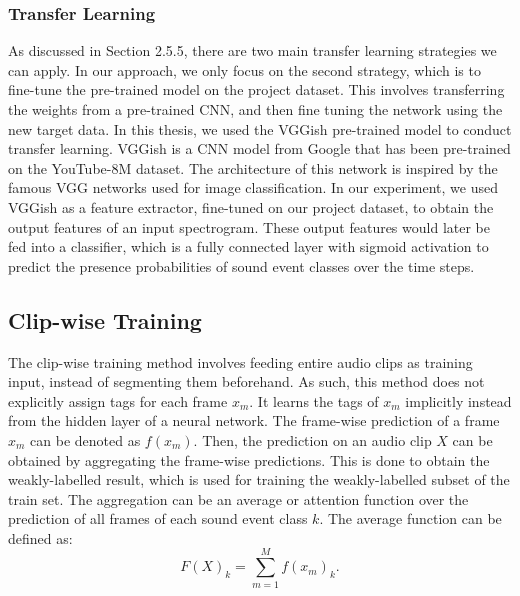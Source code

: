 \subsubsection{Transfer Learning}
As discussed in Section 2.5.5, there are two main transfer learning strategies we can apply. In our approach, we only focus on the second strategy, which is to fine-tune the pre-trained model on the project dataset. This involves transferring the weights from a pre-trained CNN, and then fine tuning the network using the new target data. In this thesis, we used the VGGish \cite{vggish} pre-trained model to conduct transfer learning. VGGish is a CNN model from Google that has been pre-trained on the YouTube-8M dataset. The architecture of this network is inspired by the famous VGG \cite{vgg} networks used for image classification. In our experiment, we used VGGish as a feature extractor, fine-tuned on our project dataset, to obtain the output features of an input spectrogram. These output features would later be fed into a classifier, which is a fully connected layer with sigmoid activation to predict the presence probabilities of sound event classes over the time steps.

\subsection{Clip-wise Training}
The clip-wise training method involves feeding entire audio clips as training input, instead of segmenting them beforehand. As such, this method does not explicitly assign tags for each frame \(x_m\). It learns the tags of \(x_m\) implicitly instead from the hidden layer of a neural network. The frame-wise prediction of a frame \(x_m\) can be denoted as \(f(x_m)\). Then, the prediction on an audio clip \(X\) can be obtained by aggregating the frame-wise predictions. This is done to obtain the weakly-labelled result, which is used for training the weakly-labelled subset of the train set. The aggregation can be an average or attention function over the prediction of all frames of each sound event class \(k\). The average function can be defined as:
\begin{equation}
F(X)_k = \sum^M_{m=1}f(x_m)_k .
\end{equation}

